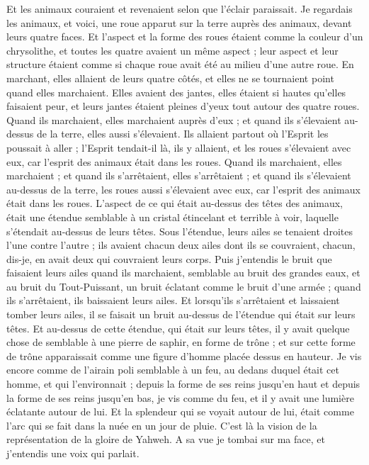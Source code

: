 \begin{multicols}{2}
Et les animaux couraient et revenaient selon que l'éclair paraissait.
Je regardais les animaux, et voici, une roue apparut sur la terre auprès des animaux, devant leurs quatre faces.
Et l'aspect et la forme des roues étaient comme la couleur d'un chrysolithe, et toutes les quatre avaient un même aspect ; leur aspect et leur structure étaient comme si chaque roue avait été au milieu d'une autre roue.
En marchant, elles allaient de leurs quatre côtés, et elles ne se tournaient point quand elles marchaient.
Elles avaient des jantes, elles étaient si hautes qu'elles faisaient peur, et leurs jantes étaient pleines d'yeux tout autour des quatre roues.
Quand ils marchaient, elles marchaient auprès d'eux ; et quand ils s'élevaient au-dessus de la terre, elles aussi s'élevaient.
Ils allaient partout où l'Esprit les poussait à aller ; l'Esprit tendait-il là, ils y allaient, et les roues s'élevaient avec eux, car l'esprit des animaux était dans les roues.
Quand ils marchaient, elles marchaient ; et quand ils s'arrêtaient, elles s'arrêtaient ; et quand ils s'élevaient au-dessus de la terre, les roues aussi s'élevaient avec eux, car l'esprit des animaux était dans les roues.
L'aspect de ce qui était au-dessus des têtes des animaux, était une étendue semblable à un cristal étincelant et terrible à voir, laquelle s'étendait au-dessus de leurs têtes.
Sous l'étendue, leurs ailes se tenaient droites l'une contre l'autre ; ils avaient chacun deux ailes dont ils se couvraient, chacun, dis-je, en avait deux qui couvraient leurs corps.
Puis j'entendis le bruit que faisaient leurs ailes quand ils marchaient, semblable au bruit des grandes eaux, et au bruit du Tout-Puissant, un bruit éclatant comme le bruit d'une armée ; quand ils s'arrêtaient, ils baissaient leurs ailes.
Et lorsqu'ils s'arrêtaient et laissaient tomber leurs ailes, il se faisait un bruit au-dessus de l'étendue qui était sur leurs têtes.
Et au-dessus de cette étendue, qui était sur leurs têtes, il y avait quelque chose de semblable à une pierre de saphir, en forme de trône ; et sur cette forme de trône apparaissait comme une figure d'homme placée dessus en hauteur.
Je vis encore comme de l'airain poli semblable à un feu, au dedans duquel était cet homme, et qui l'environnait ; depuis la forme de ses reins jusqu'en haut et depuis la forme de ses reins jusqu'en bas, je vis comme du feu, et il y avait une lumière éclatante autour de lui.
Et la splendeur qui se voyait autour de lui, était comme l'arc qui se fait dans la nuée en un jour de pluie. C'est là la vision de la représentation de la gloire de Yahweh. A sa vue je tombai sur ma face, et j'entendis une voix qui parlait.

\end{multicols}

